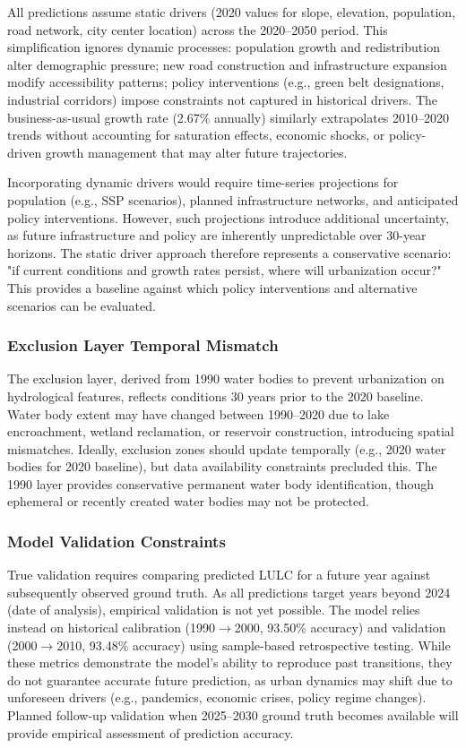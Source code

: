 \documentclass[12pt,a4paper]{article}
\begin{document}
All predictions assume static drivers (2020 values for slope, elevation, population, road network, city center location) across the 2020--2050 period. This simplification ignores dynamic processes: population growth and redistribution alter demographic pressure; new road construction and infrastructure expansion modify accessibility patterns; policy interventions (e.g., green belt designations, industrial corridors) impose constraints not captured in historical drivers. The business-as-usual growth rate (2.67\% annually) similarly extrapolates 2010--2020 trends without accounting for saturation effects, economic shocks, or policy-driven growth management that may alter future trajectories.

Incorporating dynamic drivers would require time-series projections for population (e.g., SSP scenarios), planned infrastructure networks, and anticipated policy interventions. However, such projections introduce additional uncertainty, as future infrastructure and policy are inherently unpredictable over 30-year horizons. The static driver approach therefore represents a conservative scenario: "if current conditions and growth rates persist, where will urbanization occur?" This provides a baseline against which policy interventions and alternative scenarios can be evaluated.

\subsubsection{Exclusion Layer Temporal Mismatch}

The exclusion layer, derived from 1990 water bodies to prevent urbanization on hydrological features, reflects conditions 30 years prior to the 2020 baseline. Water body extent may have changed between 1990--2020 due to lake encroachment, wetland reclamation, or reservoir construction, introducing spatial mismatches. Ideally, exclusion zones should update temporally (e.g., 2020 water bodies for 2020 baseline), but data availability constraints precluded this. The 1990 layer provides conservative permanent water body identification, though ephemeral or recently created water bodies may not be protected.

\subsubsection{Model Validation Constraints}

True validation requires comparing predicted LULC for a future year against subsequently observed ground truth. As all predictions target years beyond 2024 (date of analysis), empirical validation is not yet possible. The model relies instead on historical calibration (1990$\rightarrow$2000, 93.50\% accuracy) and validation (2000$\rightarrow$2010, 93.48\% accuracy) using sample-based retrospective testing. While these metrics demonstrate the model's ability to reproduce past transitions, they do not guarantee accurate future prediction, as urban dynamics may shift due to unforeseen drivers (e.g., pandemics, economic crises, policy regime changes). Planned follow-up validation when 2025--2030 ground truth becomes available will provide empirical assessment of prediction accuracy.
\end{document}
